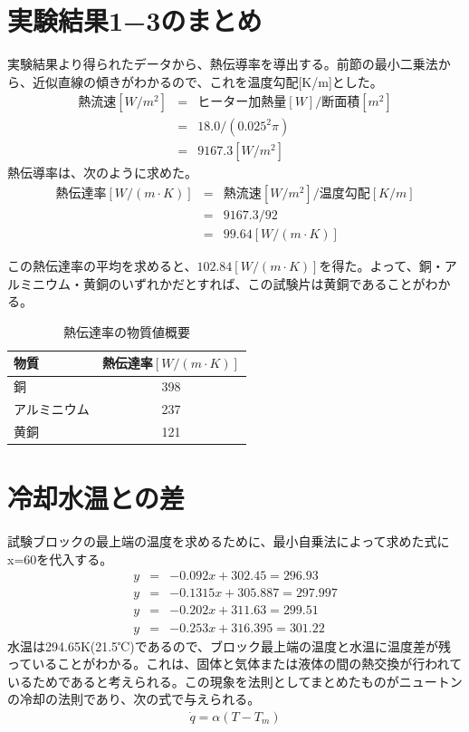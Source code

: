 \documentclass[a4j,twoside,openright,11pt]{jarticle}
\begin{document}
\section{実験結果1−3のまとめ}
実験結果より得られたデータから、熱伝導率を導出する。前節の最小二乗法から、近似直線の傾きがわかるので、これを温度勾配[K/m]とした。
\begin{eqnarray}
熱流速[W/m^2] &=& ヒーター加熱量[W] /　断面積[m^2]\nonumber\\
              &=& 18.0/(0.025^2\pi)\nonumber\\
              &=& 9167.3[W/m^2]
\end{eqnarray}
熱伝導率は、次のように求めた。
\begin{eqnarray}
熱伝達率[W/(m\cdot K)] &=& 熱流速[W/m^2] / 温度勾配[K/m]\nonumber\\
                       &=& 9167.3/92\nonumber\\
                       &=& 99.64[W/(m\cdot K)]
\end{eqnarray}

この熱伝達率の平均を求めると、$102.84[W/(m\cdot K)]$を得た。よって、銅・アルミニウム・黄銅のいずれかだとすれば、この試験片は黄銅であることがわかる。

\begin{table}[htb]
\begin{center}
  \caption{熱伝達率の物質値概要}
  \begin{tabular}{lc}
    物質&熱伝達率$[W/(m\cdot K)]$\\
\hline
    銅&398\\
    アルミニウム&237\\
    黄銅&121\\
\hline
  \end{tabular}
\end{center}
\end{table}

\section{冷却水温との差}

試験ブロックの最上端の温度を求めるために、最小自乗法によって求めた式にx=60を代入する。
\begin{eqnarray}
y&=&-0.092x+302.45 = 296.93\\
y&=&-0.1315x+305.887 = 297.997\\
y&=&-0.202x+311.63 = 299.51\\
y&=&-0.253x+316.395 = 301.22
\end{eqnarray}
水温は294.65K(21.5℃)であるので、ブロック最上端の温度と水温に温度差が残っていることがわかる。これは、固体と気体または液体の間の熱交換が行われているためであると考えられる。この現象を法則としてまとめたものがニュートンの冷却の法則であり、次の式で与えられる。
\begin{eqnarray}
  \dot{q} =\alpha (T-T_m)
\end{eqnarray}
\end{document}
